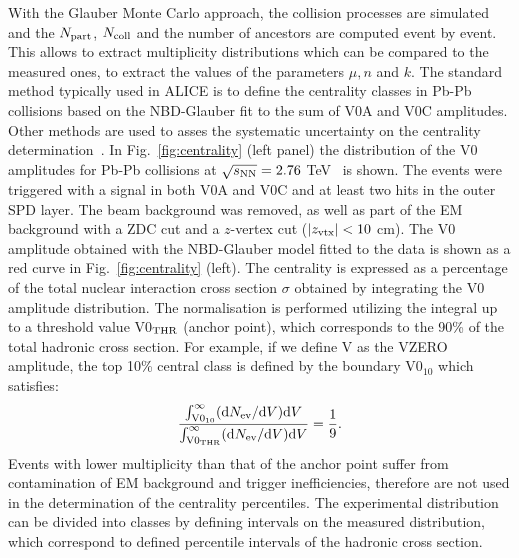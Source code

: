 With the Glauber Monte Carlo approach, the collision processes are simulated  
and the $N_{\rm part}$, $N_{\rm coll}$ and the number of ancestors are computed event by event. 
This allows to extract multiplicity distributions which can be compared to the measured ones, to extract the values of the parameters
$\mu, n $ and $k$.
The standard method typically used in ALICE is to define 
the centrality classes in Pb-Pb collisions based on the NBD-Glauber fit to the sum of V0A and V0C amplitudes. 
Other methods are used to asses the systematic uncertainty on the centrality determination~\cite{Abelev:2013qoq}.
In Fig.~\ref{fig:centrality} (left panel) the distribution of the V0 amplitudes for Pb-Pb collisions 
at $\sqrt{s_{\rm NN}}=2.76$ TeV~\cite{Abelev:2013qoq} is shown. The events were triggered with a signal in both V0A
and V0C and at least two hits in the outer SPD layer. The beam background was removed,
as well as part of the EM background with a ZDC cut and a $z$-vertex cut ($|z_{\rm vtx}|<10$ cm).
The V0 amplitude obtained with the NBD-Glauber model fitted to the data is shown as a red curve
 in Fig.~\ref{fig:centrality} (left). The centrality is expressed as a percentage of the total nuclear interaction cross section
$\sigma$ obtained by integrating the V0
amplitude distribution. The normalisation is performed utilizing the integral up to a threshold value V0$_{\rm THR}$ (anchor point), which corresponds
to the 90\% of the total hadronic cross section. For example, if we define V as the VZERO amplitude, 
the top 10\% central class is defined by the boundary V0$_{10}$ which satisfies:
\begin{equation}
\label{eq:percentileV0}
\frac{\int_{{\rm V0}_{\rm 10}}^\infty ({\rm d }N_{\rm ev} / {\rm d}V) {\rm d}V}{\int_{{\rm V0}_{\rm THR}}^\infty ({\rm d }N_{\rm ev} / {\rm d}V) {\rm d}V} = \frac{1}{9}.
\end{equation}
 Events with lower multiplicity than that of the anchor point
suffer from contamination of EM background and trigger inefficiencies, therefore are not used
in the determination of the centrality percentiles. The experimental distribution can be divided into classes by defining intervals on the measured distribution, 
which correspond to defined percentile intervals of the hadronic cross section. 
